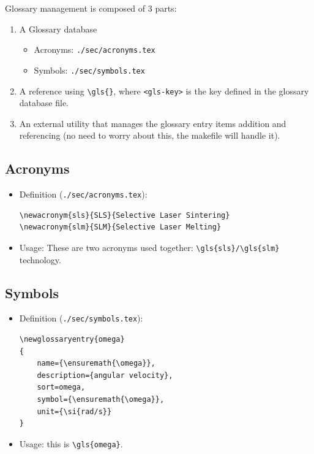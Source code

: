 \documentclass[11pt]{article}
\begin{document}
Glossary management is composed of 3 parts:
\begin{enumerate}
\item A Glossary database 
\begin{itemize}
\item Acronyms: \texttt{./sec/acronyms.tex}
\item Symbols: \texttt{./sec/symbols.tex}
\end{itemize}
\item A reference using \texttt{\textbackslash{}gls\{<gls-key>\}}, where \texttt{<gls-key>} is the key defined in
the glossary database file.
\item An external utility that manages the glossary entry items addition and
referencing (no need to worry about this, the makefile will handle it).
\end{enumerate}
\subsection{Acronyms}
\label{sec:org00ca075}
\begin{itemize}
\item Definition (\texttt{./sec/acronyms.tex}):
\lstset{language=[LaTeX]TeX,label= ,caption= ,captionpos=b,numbers=none}
\begin{lstlisting}
\newacronym{sls}{SLS}{Selective Laser Sintering}
\newacronym{slm}{SLM}{Selective Laser Melting}
\end{lstlisting}
\item Usage: These are two acronyms used together: \texttt{\textbackslash{}gls\{sls\}/\textbackslash{}gls\{slm\}} technology.
\end{itemize}

\subsection{Symbols}
\label{sec:org33b2693}
\begin{itemize}
\item Definition (\texttt{./sec/symbols.tex}):
\lstset{language=[LaTeX]TeX,label= ,caption= ,captionpos=b,numbers=none}
\begin{lstlisting}
\newglossaryentry{omega}
{
    name={\ensuremath{\omega}},
    description={angular velocity},
    sort=omega,
    symbol={\ensuremath{\omega}},
    unit={\si{rad/s}}
}
\end{lstlisting}
\item Usage: this is \texttt{\textbackslash{}gls\{omega\}}.
\end{itemize}
\end{document}
